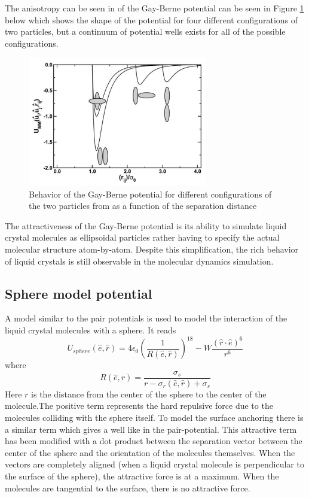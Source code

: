 \documentclass[preprint, aps]{revtex4-1}
\begin{document}
The anisotropy can be seen in of the Gay-Berne potential can be seen in Figure 
\ref{fig:gb} below which shows the shape of the potential for four different 
configurations of two particles, but a continuum of potential wells exists for 
all of the possible configurations. 
	\begin{figure}[H]
		\centering
		\includegraphics[width=0.7\textwidth]{gb.png}
		\caption{Behavior of the Gay-Berne potential for different 
			configurations of the two particles from \cite{moreno11} as a 
			function of the separation distance}
		\label{fig:gb}
	\end{figure}
The attractiveness of the Gay-Berne potential is its ability to simulate liquid 
crystal molecules as ellipsoidal particles rather having to specify the actual 
molecular structure atom-by-atom. Despite this simplification, the rich behavior
of liquid crystals is still observable in the molecular dynamics simulation.

\subsection*{Sphere model potential}
A model similar to the pair potentials is used to model the interaction of the
liquid crystal molecules with a sphere. It reads
	\begin{equation} \label{sphere-pot}
		U_{sphere} (\hat{e}, \hat{r}) 
		= 4\epsilon_0 \left(\frac{1}{R(\hat{e}, \hat{r})}\right)^{18}
		- W\frac{
			(\hat{r}\cdot\hat{e})^6
			}
			{
			r^6
			}
	\end{equation}
where 
	\begin{equation}
		R(\hat{e}, \hat{r}) = 
		\frac{
			\sigma_s
		}
		{
			r - \sigma_r(\hat{e}, \hat{r}) + \sigma_s
		}
	\end{equation}
Here $r$ is the distance from the center of the sphere to the center of the
molecule.The positive term represents the hard repulsive force due to the
molecules colliding with the sphere itself. To model the surface anchoring there
is a similar term which gives a well like in the pair-potential. This attractive
term has been modified with a dot product between the separation vector between
the center of the sphere and the orientation of the molecules themselves. When
the vectors are completely aligned (when a liquid crystal molecule is
perpendicular to the surface of the sphere), the attractive force is at a
maximum. When the molecules are tangential to the surface, there is no 
attractive force.
\end{document}
